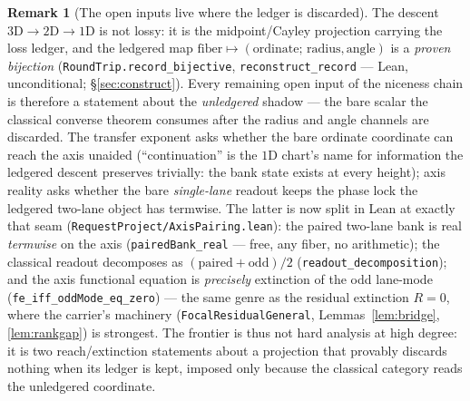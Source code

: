 \documentclass[11pt]{article}
\theoremstyle{definition}
\newtheorem{remark}[theorem]{Remark}
\begin{document}
\begin{remark}[The open inputs live where the ledger is discarded]\label{rem:ledgertoll}
The descent $3\mathrm D\to2\mathrm D\to1\mathrm D$ is not lossy: it is the midpoint/Cayley projection
carrying the loss ledger, and the ledgered map $\text{fiber}\mapsto(\text{ordinate};\,\text{radius},
\text{angle})$ is a \emph{proven bijection} (\texttt{RoundTrip.record\_bijective},
\texttt{reconstruct\_record} --- Lean, unconditional; \S\ref{sec:construct}). Every remaining open input of
the niceness chain is therefore a statement about the \emph{unledgered} shadow --- the bare scalar the
classical converse theorem consumes after the radius and angle channels are discarded. The transfer
exponent asks whether the bare ordinate coordinate can reach the axis unaided (``continuation'' is the
$1$D chart's name for information the ledgered descent preserves trivially: the bank state exists at every
height); axis reality asks whether the bare \emph{single-lane} readout keeps the phase lock the ledgered
two-lane object has termwise. The latter is now split in Lean at exactly that seam
(\texttt{RequestProject/AxisPairing.lean}): the paired two-lane bank is real \emph{termwise} on the axis
(\texttt{pairedBank\_real} --- free, any fiber, no arithmetic); the classical readout decomposes as
$(\text{paired}+\text{odd})/2$ (\texttt{readout\_decomposition}); and the axis functional equation is
\emph{precisely} extinction of the odd lane-mode (\texttt{fe\_iff\_oddMode\_eq\_zero}) --- the same genre as
the residual extinction $R=0$, where the carrier's machinery (\texttt{FocalResidualGeneral},
Lemmas~\ref{lem:bridge}, \ref{lem:rankgap}) is strongest. The frontier is thus not hard analysis at high
degree: it is two reach/extinction statements about a projection that provably discards nothing when its
ledger is kept, imposed only because the classical category reads the unledgered coordinate.
\end{remark}
\end{document}
